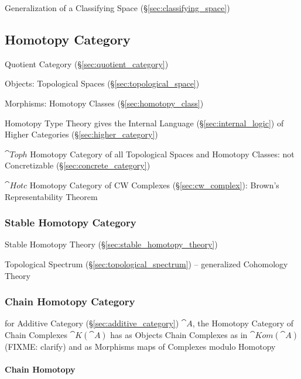Generalization of a Classifying Space (\S\ref{sec:classifying_space})



\subsection{Homotopy Category}\label{sec:homotopy_category}

Quotient Category (\S\ref{sec:quotient_category})

Objects: Topological Spaces (\S\ref{sec:topological_space})

Morphisms: Homotopy Classes (\S\ref{sec:homotopy_class})

Homotopy Type Theory gives the Internal Language
(\S\ref{sec:internal_logic}) of Higher Categories
(\S\ref{sec:higher_category})

$\cat{Toph}$ Homotopy Category of all Topological Spaces and Homotopy
Classes: not Concretizable (\S\ref{sec:concrete_category})

$\cat{Hotc}$ Homotopy Category of CW Complexes
(\S\ref{sec:cw_complex}): Brown's Representability Theorem



\subsubsection{Stable Homotopy Category}\label{sec:stable_homotopy_category}

Stable Homotopy Theory (\S\ref{sec:stable_homotopy_theory})

Topological Spectrum (\S\ref{sec:topological_spectrum}) -- generalized
Cohomology Theory



\subsubsection{Chain Homotopy Category}\label{sec:chain_homotopy_category}

for Additive Category (\S\ref{sec:additive_category}) $\cat{A}$, the Homotopy
Category of Chain Complexes $\cat{K}(\cat{A})$ has as Objects Chain Complexes as
in $\cat{Kom}(\cat{A})$ (FIXME: clarify) and as Morphisms maps of Complexes
modulo Homotopy



\paragraph{Chain Homotopy}\label{sec:chain_homotopy}\hfill

